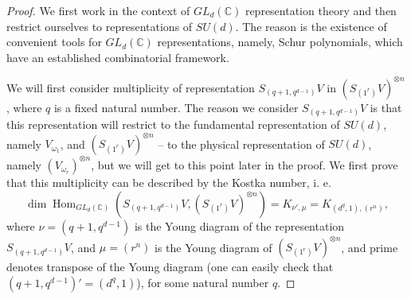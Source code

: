 \documentclass[10pt,twocolumn,superscriptaddress,aps,amsmath,amssymb,citeautoscript,floatfix,prx]{revtex4-2}
\theoremstyle{plain}
\theoremstyle{plain}
\theoremstyle{plain}
\theoremstyle{plain}
\theoremstyle{plain}
\theoremstyle{plain}
\theoremstyle{plain}
\theoremstyle{definition}
\theoremstyle{plain}
\begin{document}
\begin{appendix}
\begin{proof}
    We first work in the context of $GL_d(\mathbb{C})$ representation theory and then 
    restrict ourselves to representations of $SU(d)$. The reason is the existence of
    convenient tools for $GL_d(\mathbb{C})$ representations, namely, Schur polynomials, which have an established combinatorial framework. 
    
    We will first consider multiplicity of representation $S_{\left(q+1, q^{d-1}\right)} V$ in $\left(S_{\left(1^r\right)}V\right)^{\otimes n}$, where $q$ is a fixed natural number. 
    The reason we consider $S_{\left(q+1, q^{d-1}\right)} V$ is that this representation will restrict to the fundamental representation of $SU(d)$, namely $V_{\omega_1}$, and $\left(S_{\left(1^r\right)}V\right)^{\otimes n}$ -- to the physical representation of $SU(d)$, namely $(V_{\omega_r})^{\otimes n}$, but we 
    will get to this point later in the proof. We first prove that this multiplicity can be described by the Kostka number, i. e.
    \begin{equation}\label{eq:KostkaMultiplicity}
        \operatorname{dim} \operatorname{Hom}_{GL_d(\mathbb{C})}\left(S_{\left(q+1, q^{d-1}\right)} V,\left(S_{\left(1^r\right)}V\right)^{\otimes n}\right)=K_{\nu', \mu}=K_{\left(d^q, 1\right),\left(r^n\right)},
    \end{equation}
    where $\nu=\left(q+1, q^{d-1}\right)$ is the Young diagram of the representation $S_{\left(q+1, q^{d-1}\right)} V$, and $\mu=\left(r^n\right)$ is the Young diagram of $\left(S_{\left(1^r\right)}V\right)^{\otimes n}$, and prime
    denotes transpose of the Young diagram (one can easily check that $\left(q+1, q^{d-1}\right)' = \left(d^q, 1\right)$), for some natural number $q$.


\end{proof}
\end{appendix}
\end{document}
